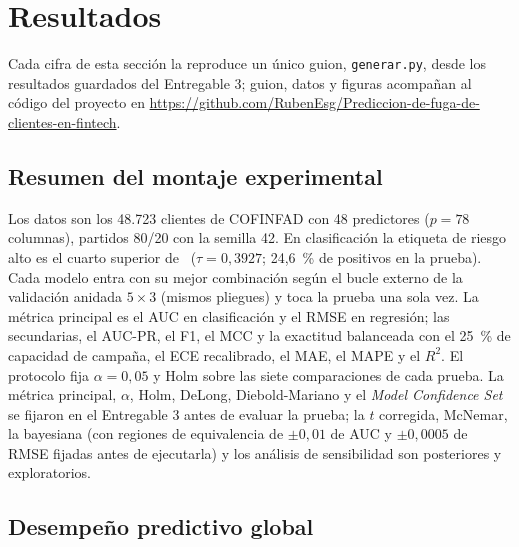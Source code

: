 \section{Resultados}
\label{sec:resultados}

Cada cifra de esta sección la reproduce un único guion, \texttt{generar.py}, desde los resultados guardados
del Entregable 3; guion, datos y figuras acompañan al código del proyecto en
\url{https://github.com/RubenEsg/Prediccion-de-fuga-de-clientes-en-fintech}.

\subsection{Resumen del montaje experimental}
\label{sec:montaje}

Los datos son los 48.723 clientes de COFINFAD \citep{cofinfad2025} con 48 predictores ($p = 78$ columnas),
partidos 80/20 con la semilla 42. En clasificación la etiqueta de riesgo alto es el cuarto
superior de \cp\ ($\tau = 0{,}3927$; 24,6~\% de positivos en la prueba). Cada modelo entra con su mejor
combinación según el bucle externo de la validación anidada $5 \times 3$ (mismos pliegues) y toca la prueba una
sola vez. La métrica principal es el AUC en clasificación y el RMSE en regresión; las secundarias, el AUC-PR, el
F1, el MCC y la exactitud balanceada con el 25~\% de capacidad de campaña, el ECE recalibrado, el MAE, el MAPE y
el $R^2$. El protocolo fija $\alpha = 0{,}05$ y Holm \citep{holm1979} sobre las siete comparaciones de cada
prueba. La métrica principal, $\alpha$, Holm, DeLong, Diebold-Mariano y el \emph{Model Confidence Set} se
fijaron en el Entregable 3 antes de evaluar la prueba; la $t$ corregida, McNemar, la bayesiana (con regiones de
equivalencia de $\pm 0{,}01$ de AUC y $\pm 0{,}0005$ de RMSE fijadas antes de ejecutarla) y los análisis de
sensibilidad son posteriores y exploratorios.

\subsection{Desempeño predictivo global}
\label{sec:global}

